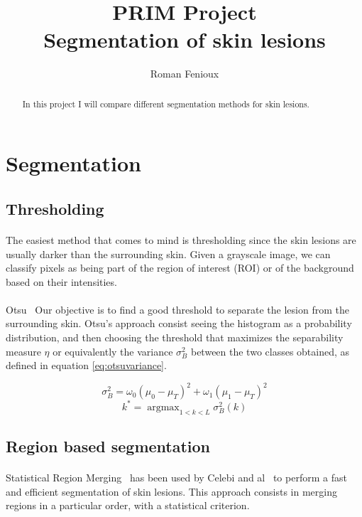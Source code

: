 \documentclass[a4paper,10pt]{article}
\title{PRIM Project\\ Segmentation of skin lesions}
\author{Roman Fenioux}
\DeclareMathOperator*{\argmax}{argmax}
\begin{document}
\maketitle
\newpage
\begin{abstract}
In this project I will compare different segmentation methods for skin lesions. 
\end{abstract}

\section{Segmentation}
\subsection{Thresholding}
\paragraph{}
The easiest method that comes to mind is thresholding since the skin lesions are 
usually darker than the surrounding skin. Given a grayscale image, we can 
classify pixels as being part of the region of interest (ROI) or of the 
background based on their intensities.
\paragraph{} Otsu~\cite{Otsu1979} 
Our objective is to find a good threshold to separate the lesion from the 
surrounding skin. Otsu's approach consist seeing the histogram as a probability 
distribution, and then choosing the threshold that maximizes the separability 
measure $\eta$ or equivalently the variance $\sigma_B^2$ between the two classes 
obtained, as defined in equation \ref{eq:otsuvariance}.

\begin{equation} \label{eq:otsuvariance}
  \sigma_B^2 = \omega_0 (\mu_0 - \mu_T)^2 + \omega_1 (\mu_1 - \mu_T)^2 
\end{equation}
\begin{equation} \label{eq:optimthresh}
  k^* = \argmax_{1<k<L} \sigma_B^2(k)   
\end{equation}

\subsection{Region based segmentation}
\paragraph{} Statistical Region Merging~\cite{nock_statistical_2004} has been 
used by Celebi and al~\cite{celebi_border_2008} to perform a fast and efficient 
segmentation of skin lesions. This approach consists in merging regions in a particular order, with a statistical criterion.
\end{document}
